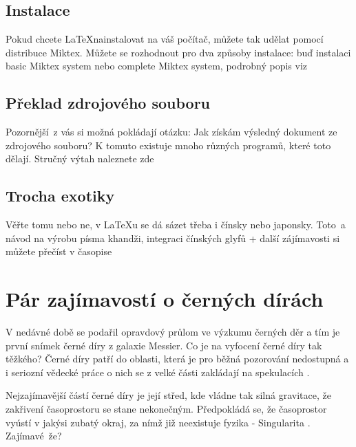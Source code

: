 \documentclass[a4paper,11pt]{article}
\begin{document}
\subsection{Instalace}
Pokud chcete \LaTeX\space nainstalovat na váš počítač, můžete tak udělat pomocí distribuce Miktex. Můžete se rozhodnout pro dva způsoby instalace: buď instalaci basic Miktex system nebo complete Miktex system, podrobný popis viz \cite{Bojko}

\subsection{Překlad zdrojového souboru}
Pozornější~z vás si možná pokládají otázku: Jak získám výsledný dokument ze zdrojového souboru?
K tomuto existuje mnoho různých programů, které toto dělají. Stručný výtah naleznete zde \cite{Martinek}

\subsection{Trocha exotiky}
Věřte tomu nebo ne, v \LaTeX u se dá sázet třeba i čínsky nebo japonsky. Toto~a návod na výrobu písma khandži, integraci čínských glyfů + další zájímavosti si můžete přečíst v časopise \cite{Casopis}

\section{Pár zajímavostí o černých dírách}
V nedávné době se podařil opravdový průlom ve výzkumu černých děr a tím je první snímek černé díry z galaxie Messier. Co je na vyfocení černé díry tak těžkého? \space Černé díry patří do oblasti, která je pro běžná pozorování nedostupná a i seriozní vědecké práce o nich se z velké části zakládají na spekulacích \cite{Curiel}.
\par Nejzajímavější částí černé díry je její střed, kde vládne tak silná gravitace, že zakřivení časoprostoru se stane nekonečným. Předpokládá se, že časoprostor vyústí v jakýsi zubatý okraj, za nímž již neexistuje fyzika - Singularita \cite{asthtekar}.\\Zajímavé~že?

\newpage

\renewcommand{\refname}{Citace}

\end{document}
